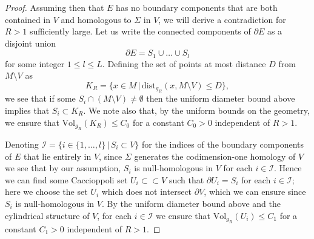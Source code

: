 \documentclass[12pt]{article}
\begin{document}
\begin{proof}


    Assuming then that $E$ has no boundary components that are both contained in $V$ and homologous to $\Sigma$ in $V$, we will derive a contradiction for $R > 1$ sufficiently large. Let us write the connected components of $\partial E$ as a disjoint union
    $$
    \partial E = S_1 \cup \dots \cup S_l
    $$
    for some integer $1 \leq l \leq L$. Defining the set of points at most distance $D$ from $M \setminus V$ as
    $$
    K_R = \{x \in M \, | \, \mathrm{dist}_{g_R}(x,M \setminus V) \leq D\},
    $$
    we see that if some $S_i \cap (M \setminus V) \neq \emptyset$ then the uniform diameter bound above implies that $S_i \subset K_R$. We note also that, by the uniform bounds on the geometry, we ensure that $\mathrm{Vol}_{g_R}(K_R) \leq C_0$ for a constant $C_0 > 0$ independent of $R > 1$.

    \bigskip
    Denoting $\mathcal{I} = \{i \in \{1,\dots,l\} \, | \, S_i \subset V \}$ for the indices of the boundary components of $E$ that lie entirely in $V$, since $\Sigma$ generates the codimension-one homology of $V$ we see that by our assumption, $S_i$ is null-homologous in $V$ for each $i \in \mathcal{I}$. Hence we can find some Caccioppoli set $U_i \subset \subset V$ such that $\partial U_i = S_i$ for each $i \in \mathcal{I}$; here we choose the set $U_i$ which does not intersect $\partial V$, which we can ensure since $S_i$ is null-homologous in $V$. By the uniform diameter bound above and the cylindrical structure of $V$, for each $i \in \mathcal{I}$ we ensure that $\mathrm{Vol}_{g_R}(U_i) \leq C_1$ for a constant $C_1 > 0$ independent of $R > 1$.


\end{proof}
\end{document}
